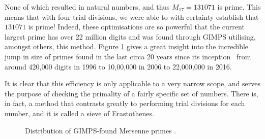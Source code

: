 None of which resulted in natural numbers, and thus $M_{17} = 131071$ is prime. This means that with four trial divisions, we were able to with certainty establish that $131071$ is prime! Indeed, these optimisations are so powerful that the current largest prime has over 22 million digits and was found through GIMPS utilising, amongst others, this method. Figure \ref{gr:MersennePrimes} gives a great insight into the incredible jump in size of primes found in the last circa 20 years since its inception \textendash\ from around 420,000 digits in 1996 to 10,00,000 in 2006 to 22,000,000 in 2016.

It is clear that this efficiency is only applicable to a very narrow scope, and serves the purpose of checking the primality of a fairly specific set of numbers. There is, in fact, a method that contrasts greatly to performing trial divisions for each number, and it is called a sieve of Erastothenes. 

\begin{figure} [h]
	\caption{Distribution of GIMPS-found Mersenne primes \citep{GimpsFoundNumbers}.}
	\label{gr:MersennePrimes}
\end{figure}
\vspace{5cm} %